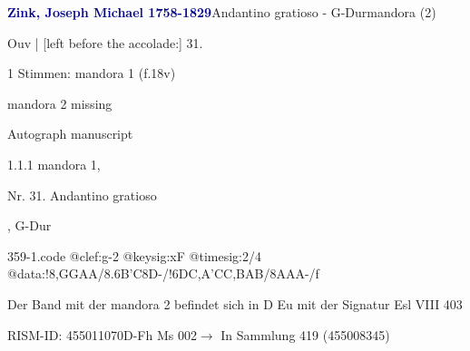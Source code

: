 \documentclass[twocolumn, 12pt]{book}
\begin{document}
\par \vspace{16pt} \textcolor{darkblue}{\textbf{Zink, Joseph Michael  1758-1829}}\hfillplus{\textbf{[359]}}\newline Andantino gratioso - G-Dur\newline mandora (2)
\par \begin{itshape}[f.18v, at left:] Ouv | [left before the accolade:] 31.\end{itshape} 
\par \textcolor{darkblue}{}  1 Stimmen: mandora 1  (f.18v)\newline \begin{small} mandora 2 missing\end{small} \newline Autograph manuscript
\par 1.1.1  mandora 1, \begin{itshape}Nr. 31. Andantino gratioso\end{itshape}, G-Dur  
\begin{filecontents*}{359-1.code}
@clef:g-2
@keysig:xF
@timesig:2/4
@data:!8,GGAA/{8.6B'C}8D-/!{6DC}{,A'C}{C,B}{AB}/8AAA-/f
\end{filecontents*}
\newline %
\par Der Band mit der mandora 2 befindet sich in D Eu mit der Signatur Esl VIII 403
\par RISM-ID: 455011070\newline D-Fh  Ms 002\newline $\rightarrow$ In Sammlung 419 (455008345)
      
\end{document}
